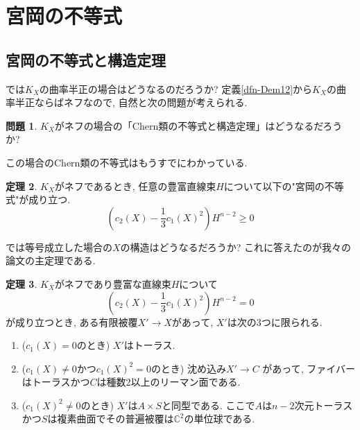 \documentclass[dvipdfmx]{msjproc}
\theoremstyle{definition}
\newtheorem{thm}{定理}[section]
\newtheorem{ques}[thm]{問題}
\begin{document}
\section{宮岡の不等式}

\subsection{宮岡の不等式と構造定理}
では$K_X$の曲率半正の場合はどうなるのだろうか?
定義\ref{dfn-Dem12}から$K_X$の曲率半正ならばネフなので, 自然と次の問題が考えられる. 

\begin{ques}
$K_X$がネフの場合の「Chern類の不等式と構造定理」はどうなるだろうか?
\end{ques}

この場合のChern類の不等式はもうすでにわかっている.
\begin{thm}\cite{Miy87}
$K_X $がネフであるとき, 任意の豊富直線束$H$について以下の"宮岡の不等式"が成り立つ.
\begin{equation}
\label{eq-Miyaoka}
\left( c_2(X) - \frac{1}{3}c_1(X)^2 \right) H^{n-2}\ge 0
\end{equation}
\end{thm}

では等号成立した場合の$X$の構造はどうなるだろうか? 
これに答えたのが我々の論文\cite{IMM24}の主定理である.

\begin{thm}\cite{IMM24}
\label{thm-IMM24}
$K_X $がネフであり豊富な直線束$H$について
\begin{equation}
\label{eq-Miyaoka}
\left( c_2(X) - \frac{1}{3}c_1(X)^2 \right) H^{n-2} =0
\end{equation}
が成り立つとき, ある有限被覆$X' \to X$があって, $X'$は次の3つに限られる. 
\begin{enumerate}
  \setlength{\parskip}{0cm} 
  \setlength{\itemsep}{0cm} 
\item ($c_1(X)=0$のとき) $X'$はトーラス.

\item ($c_1(X) \neq 0$かつ$c_1(X)^{2}=0$のとき) 沈め込み$X' \to C$ があって, ファイバーはトーラスかつ$C$は種数2以上のリーマン面である. 

\item ($c_1(X)^{2} \neq 0$のとき) $X'$は$A \times S$と同型である. ここで$A$は$n-2$次元トーラスかつ$S$は複素曲面でその普遍被覆は$\mathbb{C}^{2}$の単位球である.
\end{enumerate}
\end{thm}
\end{document}
